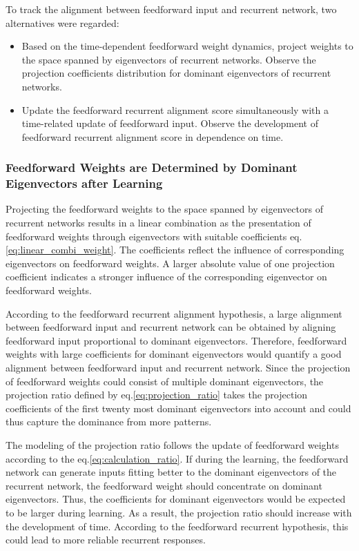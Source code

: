 \documentclass[11pt]{article}
\begin{document}
	To track the alignment between feedforward input and recurrent network, two alternatives were regarded:
		\begin{itemize}
			\item Based on the time-dependent feedforward weight dynamics, project weights to the space spanned by eigenvectors of recurrent networks. Observe the projection coefficients distribution for dominant eigenvectors of recurrent networks.
			\item Update the feedforward recurrent alignment score simultaneously with a time-related update of feedforward input. Observe the development of feedforward recurrent alignment score in dependence on time. 
		\end{itemize}

	\subsubsection{Feedforward Weights are Determined by Dominant Eigenvectors after Learning}
	
	Projecting the feedforward weights to the space spanned by eigenvectors of recurrent networks results in a linear combination as the presentation of feedforward weights through eigenvectors with suitable coefficients eq. \ref{eq:linear_combi_weight}. The coefficients reflect the influence of corresponding eigenvectors on feedforward weights. A larger absolute value of one projection coefficient indicates a stronger influence of the corresponding eigenvector on feedforward weights. 
	
	According to the feedforward recurrent alignment hypothesis, a large alignment between feedforward input and recurrent network can be obtained by aligning feedforward input proportional to dominant eigenvectors. 
	Therefore, feedforward weights with large coefficients for dominant eigenvectors would quantify a good alignment between feedforward input and recurrent network. Since the projection of feedforward weights could consist of multiple dominant eigenvectors, the projection ratio defined by eq.\ref{eq:projection_ratio} takes the projection coefficients of the first twenty most dominant eigenvectors into account and could thus capture the dominance from more patterns. 
	
	The modeling of the projection ratio follows the update of feedforward weights according to the eq.\ref{eq:calculation_ratio}. If during the learning, the feedforward network can generate inputs fitting better to the dominant eigenvectors of the recurrent network, the feedforward weight should concentrate on dominant eigenvectors. Thus, the coefficients for dominant eigenvectors would be expected to be larger during learning. As a result, the projection ratio should increase with the development of time. According to the feedforward recurrent hypothesis, this could lead to more reliable recurrent responses. 
	
\end{document}
